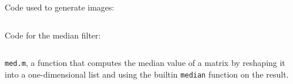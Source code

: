 Code used to generate images:
\inputminted[linenos=true]{octave}{../code/2.2.m}

Code for the median filter:
\inputminted[linenos=true]{octave}{../code/medianfilter.m}

\texttt{med.m}, a function that computes the median value of a matrix by reshaping it into a one-dimensional list and using the builtin \texttt{median} function on the result.
\inputminted[linenos=true]{octave}{../code/med.m}
